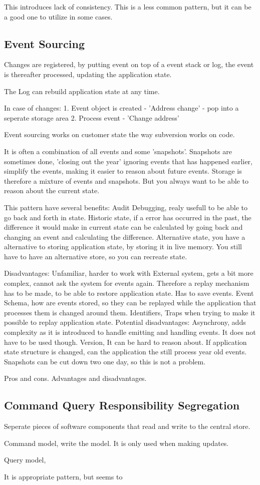 This introduces lack of consistency. This is a less common pattern, but it can be a good one to utilize in some cases.

\subsection{Event Sourcing}
Changes are registered, by putting event on top of a event stack or log, the event is thereafter processed, updating the application state.

The Log can rebuild application state at any time.

In case of changes:
1. Event object is created - 'Address change' - pop into a seperate storage area
2. Process event - 'Change address'

Event sourcing works on customer state the way subversion works on code.

It is often a combination of all events and some 'snapshots'. Snapshots are sometimes done, 'closing out the year' ignoring events that has happened earlier, simplify the events, making it easier to reason about future events. Storage is therefore a mixture of events and snapshots. But you always want to be able to reason about the current state.

This pattern have several benefits:
Audit
Debugging, realy usefull to be able to go back and forth in state.
Historic state, if a error has occurred in the past, the difference it would make in current state can be calculated by going back and changing an event and calculating the difference.
Alternative state, you have a alternative to storing application state, by storing it in live memory. You still have to have an alternative store, so you can recreate state.

Disadvantages:
Unfamiliar, harder to work with
External system, gets a bit more complex, cannot ask the system for events again. Therefore a replay mechanism has to be made, to be able to restore application state. Has to save events.
Event Schema, how are events stored, so they can be replayed while the application that processes them is changed around them.
Identifiers, Traps when trying to make it possible to replay application state.
Potential disadvantages:
Asynchrony, adds complexity as it is introduced to handle emitting and handling events. It does not have to be used though.
Version, It can be hard to reason about. If application state structure is changed, can the application the still process year old events. Snapshots can be cut down two one day, so this is not a problem.

Pros and cons. Advantages and disadvantages.

\subsection{Command Query Responsibility Segregation}
Seperate pieces of software components that read and write to the central store.

Command model, write the model. It is only used when making updates.

Query model, 

It is appropriate pattern, but seems to 


